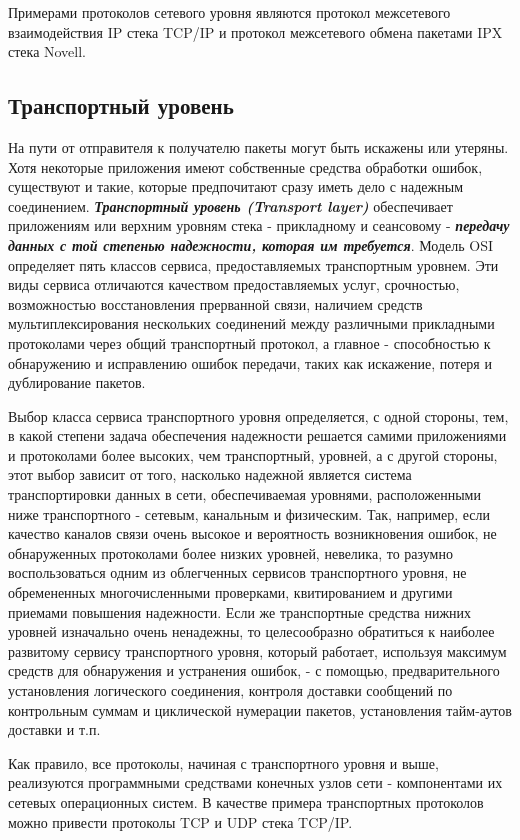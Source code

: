 Примерами протоколов сетевого уровня являются протокол межсетевого взаимодействия IP стека TCP/IP и протокол межсетевого обмена пакетами IPX стека Novell.

\subsection{Транспортный уровень}

На пути от отправителя к получателю пакеты могут быть искажены или утеряны.
Хотя некоторые приложения имеют собственные средства обработки ошибок, существуют и такие, которые предпочитают сразу иметь дело с надежным соединением.
\textbf{\textit{Транспортный уровень (Transport layer)}} обеспечивает приложениям или верхним уровням стека - прикладному и сеансовому - \textbf{\textit{передачу данных с той степенью надежности, которая им требуется}}.
Модель OSI определяет пять классов сервиса, предоставляемых транспортным уровнем.
Эти виды сервиса отличаются качеством предоставляемых услуг, срочностью, возможностью восстановления прерванной связи, наличием средств мультиплексирования нескольких соединений между различными прикладными протоколами через общий транспортный протокол, а главное - способностью к обнаружению и исправлению ошибок передачи, таких как искажение, потеря и дублирование пакетов.

Выбор класса сервиса транспортного уровня определяется, с одной стороны, тем, в какой степени задача обеспечения надежности решается самими приложениями и протоколами более высоких, чем транспортный, уровней, а с другой стороны, этот выбор зависит от того, насколько надежной является система транспортировки данных в сети, обеспечиваемая уровнями, расположенными ниже транспортного - сетевым, канальным и физическим.
Так, например, если качество каналов  связи очень высокое и вероятность возникновения ошибок, не обнаруженных протоколами более низких уровней, невелика, то разумно воспользоваться одним из облегченных сервисов транспортного уровня, не обремененных многочисленными проверками, квитированием и другими приемами повышения надежности.
Если же транспортные средства нижних уровней изначально очень ненадежны, то целесообразно обратиться к наиболее развитому сервису транспортного уровня, который работает, используя максимум средств для обнаружения и устранения ошибок, - с помощью, предварительного установления логического соединения, контроля доставки сообщений по контрольным суммам и циклической нумерации пакетов, установления тайм-аутов доставки и т.п.

Как правило, все протоколы, начиная с транспортного уровня и выше, реализуются программными средствами конечных узлов сети - компонентами их сетевых операционных систем.
В качестве примера транспортных протоколов можно привести протоколы TCP и UDP стека TCP/IP.

